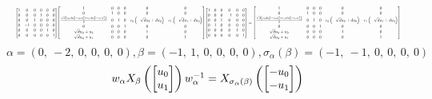 \documentclass[11pt]{article}
\theoremstyle{definition}
\begin{document}
\[
\scaletoalign{\textwidth}{{\left[\begin{matrix}1 & 0 & 0 & 0 & 0 & 0\\0 & 0 & 0 & 1 & 0 & 0\\0 & 0 & 1 & 0 & 0 & 0\\0 & -1 & 0 & 0 & 0 & 0\\0 & 0 & 0 & 0 & 1 & 0\\0 & 0 & 0 & 0 & 0 & 1\end{matrix}\right]} {\left[\begin{matrix}1 & 0 & 0 & 0 & 0 & 0\\0 & 1 & 0 & 0 & 0 & 0\\\frac{\sqrt{d} \left(c_{0} d u_{0}^{2} - c_{0} u_{2}^{2} + c_{1} d u_{3}^{2} - c_{1} u_{1}^{2}\right)}{2} & 0 & 1 & 0 & c_{0} \left(- \sqrt{d} u_{2} + d u_{0}\right) & c_{1} \left(- \sqrt{d} u_{1} + d u_{3}\right)\\0 & 0 & 0 & 1 & 0 & 0\\\sqrt{d} u_{0} + u_{2} & 0 & 0 & 0 & 1 & 0\\\sqrt{d} u_{3} + u_{1} & 0 & 0 & 0 & 0 & 1\end{matrix}\right]} {\left[\begin{matrix}1 & 0 & 0 & 0 & 0 & 0\\0 & 0 & 0 & -1 & 0 & 0\\0 & 0 & 1 & 0 & 0 & 0\\0 & 1 & 0 & 0 & 0 & 0\\0 & 0 & 0 & 0 & 1 & 0\\0 & 0 & 0 & 0 & 0 & 1\end{matrix}\right]} = {\left[\begin{matrix}1 & 0 & 0 & 0 & 0 & 0\\0 & 1 & 0 & 0 & 0 & 0\\\frac{\sqrt{d} \left(c_{0} d u_{0}^{2} - c_{0} u_{2}^{2} + c_{1} d u_{3}^{2} - c_{1} u_{1}^{2}\right)}{2} & 0 & 1 & 0 & c_{0} \left(- \sqrt{d} u_{2} + d u_{0}\right) & c_{1} \left(- \sqrt{d} u_{1} + d u_{3}\right)\\0 & 0 & 0 & 1 & 0 & 0\\\sqrt{d} u_{0} + u_{2} & 0 & 0 & 0 & 1 & 0\\\sqrt{d} u_{3} + u_{1} & 0 & 0 & 0 & 0 & 1\end{matrix}\right]}}
\]
\[
\alpha = \left( 0, \  -2, \  0, \  0, \  0, \  0\right), \beta = \left( -1, \  1, \  0, \  0, \  0, \  0\right), \sigma_{\alpha}(\beta) = \left( -1, \  -1, \  0, \  0, \  0, \  0\right)
\]
\[
\scaletoalign{\textwidth}{w_{\alpha} X_{\beta}\left(\left[\begin{matrix}u_{0}\\u_{1}\end{matrix}\right]\right) w_{\alpha}^{-1} = X_{\sigma_{\alpha}\left(\beta\right)}\left(\left[\begin{matrix}- u_{0}\\- u_{1}\end{matrix}\right]\right)}
\]
\end{document}
